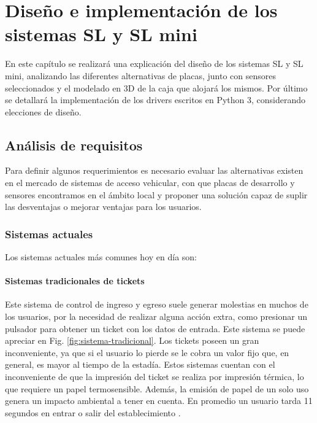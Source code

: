 \chapter{Diseño e implementación de los sistemas SL y SL mini}

En este capítulo se realizará una explicación del diseño de los sistemas SL y SL mini, analizando las diferentes alternativas de placas, junto con sensores seleccionados y el modelado en 3D de la caja que alojará los mismos. Por último se detallará la implementación de los drivers escritos en Python 3, considerando elecciones de diseño.

\section{Análisis de requisitos}

Para definir algunos requerimientos es necesario evaluar las alternativas existen en el mercado de sistemas de acceso vehicular, con que placas de desarrollo y sensores encontramos en el ámbito local y proponer una solución capaz de suplir las desventajas o mejorar ventajas para los usuarios.

\subsection{Sistemas actuales}

Los sistemas actuales más comunes hoy en día son:

\subsubsection{Sistemas tradicionales de tickets}

Este sistema de control de ingreso y egreso suele generar molestias en muchos de los usuarios, por la necesidad de realizar alguna acción extra, como presionar un pulsador para obtener un ticket con los datos de entrada. Este sistema se puede apreciar en Fig. \ref{fig:sistema-tradicional}.
Los tickets poseen un gran inconveniente, ya que si el usuario lo pierde se le cobra un valor fijo que, en general, es mayor al tiempo de la estadía.
Estos sistemas cuentan con el inconveniente de que la impresión del ticket se realiza por impresión térmica, lo que requiere un papel termosensible.
Además, la emisión de papel de un solo uso genera un impacto ambiental a tener en cuenta.
En promedio un usuario tarda 11 segundos en entrar o salir del establecimiento \cite{casadomo_sistema_2015}.

